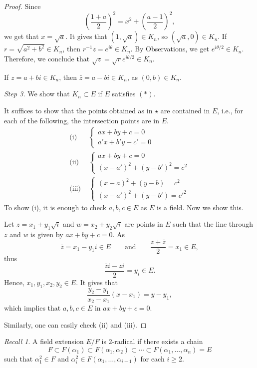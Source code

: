 \documentclass[twoside]{article}
\theoremstyle{remark}
\newtheorem*{recall}{Recall}
\newcounter{theorem}
\begin{document}
\begin{proof}
  Since
  \[ \left( \frac{1+a}2 \right)^2 = x^2 + \left( \frac{a-1}2 \right)^2, \]
  we get that \(x = \sqrt a\). It gives that \((1,\sqrt a) \in K_n\), so \((\sqrt a,0) \in K_n\). If \(r = \sqrt{a^2+b^2} \in K_n\), then \(r^{-1}z = e^{i\theta} \in K_n\). By Observations, we get \(e^{i\theta/2} \in K_n\). Therefore, we conclude that \(\sqrt z = \sqrt r e^{i\theta/2} \in K_n\).
  
  If \(z = a+bi \in K_n\), then \(\bar z = a-bi \in K_n\), as \((0,b) \in K_n\).
  
  \smallskip
  
  \emph{Step 3.} We show that \(K_n \subset E\) if \(E\) satisfies \((*)\).
  
  It suffices to show that the points obtained as in \(\star\) are contained in \(E\), i.e., for each of the following, the intersection points are in \(E\).
  \begin{align*}
    \text{(i) } & \begin{cases} ax+by+c = 0 \\ a'x+b'y+c' = 0 \end{cases} \\
    \text{(ii) } & \begin{cases} ax+by+c = 0 \\ (x-a')^2 + (y-b')^2 = c^2 \end{cases} \\
    \text{(iii) } & \begin{cases} (x-a)^2 + (y-b) = c^2 \\ (x-a')^2 + (y-b') = c'^2 \end{cases}
  \end{align*}
  To show (i), it is enough to check \(a,b,c \in E\) as \(E\) is a field. Now we show this.
  
  Let \(z = x_1+y_1\sqrt i\) and \(w = x_2+y_2\sqrt i\) are points in \(E\) such that the line through \(z\) and \(w\) is given by \(ax+by+c = 0\). As
  \[ \bar z = x_1 - y_1 i \in E \qquad \text{and} \qquad \frac{z+\bar z}2 = x_1 \in E, \]
  thus
  \[ \frac{\bar z i - zi}2 = y_i \in E. \]
  Hence, \(x_1, y_1, x_2, y_2 \in E\). It gives that
  \[ \frac{y_2-y_1}{x_2-x_1} (x-x_1) = y-y_1, \]
  which implies that \(a,b,c \in E\) in \(ax+by+c=0\).
  
  Similarly, one can easily check (ii) and (iii).
\end{proof}

\begin{recall}
  A field extension \(E/F\) is \(2\)-radical if there exists a chain
  \[ F \subset F(\alpha_1) \subset F(\alpha_1,\alpha_2) \subset \cdots \subset F(\alpha_1, \dots, \alpha_n) = E \]
  such that \(\alpha_1^2 \in F\) and \(\alpha_i^2 \in F(\alpha_1,\dots,\alpha_{i-1})\) for each \(i \geq 2\).
\end{recall}
\end{document}

